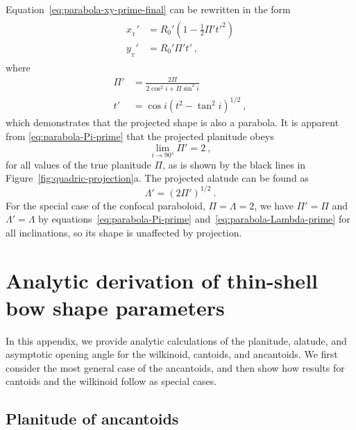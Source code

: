 \documentclass[useAMS, usenatbib, a4paper]{mnras}
\newcommand\T{_{\mathrm{\scriptscriptstyle T}}} %
\begin{document}
Equation~\eqref{eq:parabola-xy-prime-final} can be rewritten in the
form
\begin{gather}
  \label{eq:parabola-xy-all-primes}
  \begin{aligned}
    x_{\T}' &= R_0' \left(1  - \tfrac{1}{2} \Pi' t'^2\right) \\
    y_{\T}' &= R_0' \Pi' t' \ ,
  \end{aligned}
\end{gather}
where
\begin{align}
  \label{eq:parabola-Pi-prime}
  \Pi' &= \frac{2 \Pi} {2 \cos^2 i + \Pi \sin^2 i} \\
  \label{eq:parabola-t-prime}
  t' &= \cos i \left(t^2 - \tan^2 i\right)^{1/2} \ ,
\end{align}
which demonstrates that the projected shape is also a parabola. It is
apparent from \eqref{eq:parabola-Pi-prime} that the projected
planitude obeys
\begin{equation*}
\lim_{i \to \ang{90}} \Pi' = 2 \ ,
\end{equation*}
for all values of the true planitude \(\Pi\), as is shown by the black
lines in Figure~\ref{fig:quadric-projection}a. The projected alatude can
be found as
\begin{equation}
  \label{eq:parabola-Lambda-prime}
  \Lambda' = \left( 2 \Pi' \right)^{1/2} \ .
\end{equation}
For the special case of the confocal paraboloid,
\(\Pi = \Lambda = 2\), we have \(\Pi' = \Pi\) and
\(\Lambda' = \Lambda\) by equations~\eqref{eq:parabola-Pi-prime}
and~\eqref{eq:parabola-Lambda-prime} for all inclinations, so its
shape is unaffected by projection.
\section{Analytic derivation of thin-shell bow shape parameters}
\label{sec:thin-shell-shapes}

In this appendix, we provide analytic calculations of the planitude,
alatude, and asymptotic opening angle for the wilkinoid, cantoids, and
ancantoids.  We first consider the most general case of the
ancantoids, and then show how results for cantoids and the wilkinoid
follow as special cases.

\subsection{Planitude of ancantoids}
\label{sec:ancantoid-planitude}
\end{document}
